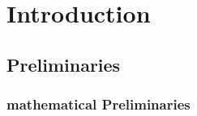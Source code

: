 \chapter{Introduction}

%
%
%

\section{ Preliminaries }

\subsection{ mathematical Preliminaries }

